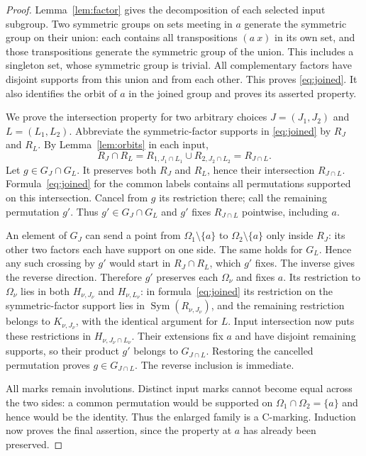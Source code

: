 \documentclass[a4paper,11pt]{article}
\newcommand{\Sym}{\operatorname{Sym}}
\begin{document}
\begin{proof}
Lemma~\ref{lem:factor} gives the decomposition of each selected input
subgroup. Two symmetric groups on sets meeting in $a$ generate the symmetric
group on their union: each contains all transpositions $(a\ x)$ in its own
set, and those transpositions generate the symmetric group of the union.
This includes a singleton set, whose symmetric group is trivial.
All complementary factors have disjoint supports from this union and from
each other. This proves \eqref{eq:joined}. It also identifies the orbit of
$a$ in the joined group and proves its asserted property.

We prove the intersection property for two arbitrary choices
$J=(J_1,J_2)$ and $L=(L_1,L_2)$. Abbreviate the symmetric-factor supports
in \eqref{eq:joined} by $R_J$ and $R_L$. By Lemma~\ref{lem:orbits} in
each input,
\[
 R_J\cap R_L
   =R_{1,J_1\cap L_1}\cup R_{2,J_2\cap L_2}
   =R_{J\cap L}.
\]
Let $g\in G_J\cap G_L$. It preserves both $R_J$ and $R_L$, hence their
intersection $R_{J\cap L}$. Formula~\eqref{eq:joined} for the common labels
contains all permutations supported on this intersection. Cancel from $g$
its restriction there; call the remaining permutation $g'$. Thus
$g'\in G_J\cap G_L$ and $g'$ fixes $R_{J\cap L}$ pointwise, including $a$.

An element of $G_J$ can send a point from
$\Omega_1\setminus\{a\}$ to $\Omega_2\setminus\{a\}$ only inside
$R_J$: its other two factors each have support on one side. The same
holds for $G_L$. Hence any such crossing by $g'$ would start in
$R_J\cap R_L$, which $g'$ fixes. The inverse gives the reverse direction.
Therefore $g'$ preserves each $\Omega_\nu$ and fixes $a$.
Its restriction to $\Omega_\nu$ lies in both $H_{\nu,J_\nu}$ and
$H_{\nu,L_\nu}$: in formula~\eqref{eq:joined} its restriction on the
symmetric-factor support lies in $\Sym(R_{\nu,J_\nu})$, and the
remaining restriction belongs to $K_{\nu,J_\nu}$, with the identical
argument for $L$. Input intersection now puts these restrictions in
$H_{\nu,J_\nu\cap L_\nu}$. Their extensions fix $a$ and have disjoint
remaining supports, so their product $g'$ belongs to $G_{J\cap L}$.
Restoring the cancelled permutation proves $g\in G_{J\cap L}$.
The reverse inclusion is immediate.

All marks remain involutions. Distinct input marks cannot become equal
across the two sides: a common permutation would be supported on
$\Omega_1\cap\Omega_2=\{a\}$ and hence would be the identity.
Thus the enlarged family is a C-marking. Induction now proves the final
assertion, since the property at $a$ has already been preserved.
\end{proof}
\end{document}

